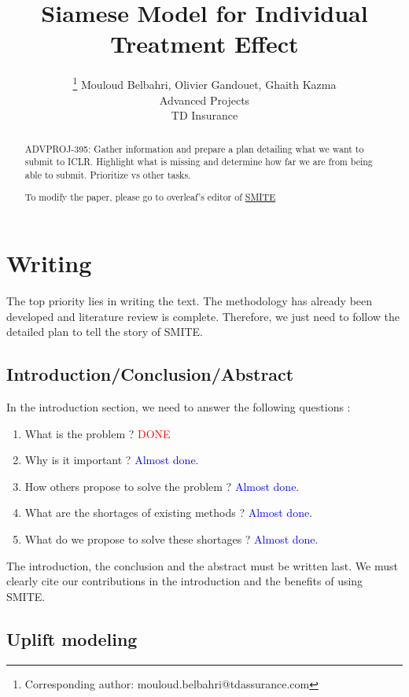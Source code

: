 \documentclass{article}
\title{Siamese Model for Individual Treatment Effect}
\author{
  \thanks{Corresponding author: mouloud.belbahri@tdassurance.com} Mouloud Belbahri, Olivier Gandouet, Ghaith Kazma \\
  Advanced Projects\\
  TD Insurance
}
\begin{document}
\maketitle

\begin{abstract}
ADVPROJ-395: Gather information and prepare a plan detailing what we want to submit to ICLR. Highlight what is missing and determine how far we are from being able to submit. Prioritize vs other tasks.

To modify the paper, please go to overleaf's editor of  \hyperlink{https://www.overleaf.com/1569557685tkvrkhfpkyfb}{SMITE}
\end{abstract}


\section{Writing}

The top priority lies in writing the text. The methodology has already been developed and literature review is complete. Therefore, we just need to follow the detailed plan to tell the story of SMITE.

\subsection{Introduction/Conclusion/Abstract}

In the introduction section, we need to answer the following questions :

\begin{enumerate}
    \item What is the problem ? \textcolor{red}{DONE}
    \item Why is it important ? \textcolor{blue}{Almost done.}
    \item How others propose to solve the problem ? \textcolor{blue}{Almost done.}
    \item What are the shortages of existing methods ? \textcolor{blue}{Almost done.}
    \item What do we propose to solve these shortages ? \textcolor{blue}{Almost done.}
\end{enumerate}

The introduction, the conclusion and the abstract must be written last. We must clearly cite our contributions in the introduction and the benefits of using SMITE.

\subsection{Uplift modeling}
\end{document}
